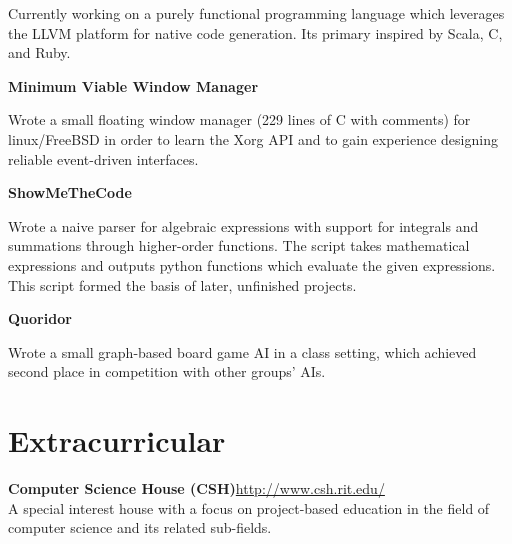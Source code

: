 \documentclass[letter,margin,line]{resume}
\newcommand{\rurl}[1]{\hfill {\footnotesize \url{#1}}}
\begin{document}
\begin{resume}
\begin{asparablank}
		\small Currently working on a purely functional programming language which leverages the LLVM platform for native code generation. Its primary inspired by Scala, C, and Ruby. 
		\normalsize
		\\
	
		\item {\bf Minimum Viable Window Manager}
		
		\small Wrote a small floating window manager (229 lines of C with comments) for linux/FreeBSD in order to learn the Xorg API and to gain experience designing reliable event-driven interfaces. 
		\normalsize
		\\
		
		\item {\bf ShowMeTheCode}
		
		\small Wrote a naive parser for algebraic expressions with support for integrals and summations through higher-order functions. The script takes mathematical expressions and outputs python functions which evaluate the given expressions. This script formed the basis of later, unfinished projects. 
		\normalsize		
		\\

		\item {\bf Quoridor}
		
		\small Wrote a small graph-based board game AI in a class setting, which achieved second place in competition with other groups' AIs.
		\normalsize
		\\
		
	\end{asparablank}	

\section{\mysidestyle Extracurricular}
	\begin{asparablank}
		\item {\bf Computer Science House ({\small CSH})}\rurl{http://www.csh.rit.edu/}
		\\		
		\small A special interest house with a focus on project-based education in the field of computer science and its related sub-fields.
	\end{asparablank}

\end{resume}
\end{document}
